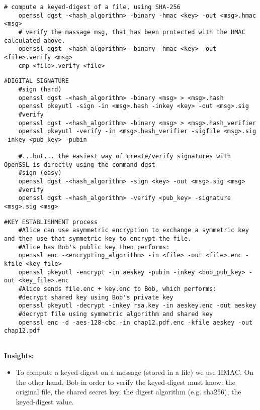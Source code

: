 \begin{lstlisting}[style=bashStyle]
    # compute a keyed-digest of a file, using SHA-256
    openssl dgst -<hash_algorithm> -binary -hmac <key> -out <msg>.hmac <msg>
    # verify the massage msg, that has been protected with the HMAC calculated above.
    openssl dgst -<hash_algorithm> -binary -hmac <key> -out <file>.verify <msg>
    cmp <file>.verify <file>
\end{lstlisting}


\begin{lstlisting}[style=bashStyle]
    #DIGITAL SIGNATURE
    #sign (hard)
    openssl dgst -<hash_algorithm> -binary <msg> > <msg>.hash
    openssl pkeyutl -sign -in <msg>.hash -inkey <key> -out <msg>.sig
    #verify
    openssl dgst -<hash_algorithm> -binary <msg> > <msg>.hash_verifier
    openssl pkeyutl -verify -in <msg>.hash_verifier -sigfile <msg>.sig -inkey <pub_key> -pubin

    #...but... the easiest way of create/verify signatures with OpenSSL is directly using the command dgst
    #sign (easy)
    openssl dgst -<hash_algorithm> -sign <key> -out <msg>.sig <msg>
    #verify
    openssl dgst -<hash_algorithm> -verify <pub_key> -signature <msg>.sig <msg>

\end{lstlisting}

\begin{lstlisting}[style=bashStyle]
    #KEY ESTABLISHMENT process
    #Alice can use asymmetric encryption to exchange a symmetric key and then use that symmetric key to encrypt the file.
    #Alice has Bob's public key then performs:
    openssl enc -<encrypting_algorithm> -in <file> -out <file>.enc -kfile <key_file>
    openssl pkeyutl -encrypt -in aeskey -pubin -inkey <bob_pub_key> -out <key_file>.enc
    #Alice sends file.enc + key.enc to Bob, which performs:
    #decrypt shared key using Bob's private key
    openssl pkeyutl -decrypt -inkey rsa.key -in aeskey.enc -out aeskey
    #decrypt file using symmetric algorithm and shared key
    openssl enc -d -aes-128-cbc -in chap12.pdf.enc -kfile aeskey -out chap12.pdf
    
\end{lstlisting}

\textbf{Insights:}
\begin{itemize}
    \item To compute a keyed-digest on a message (stored in a file) we use HMAC. On the other hand, Bob in order to verify the keyed-digest must know: the original file, the shared secret key, the digest algorithm (e.g. sha256), the keyed-digest value.
\end{itemize}

